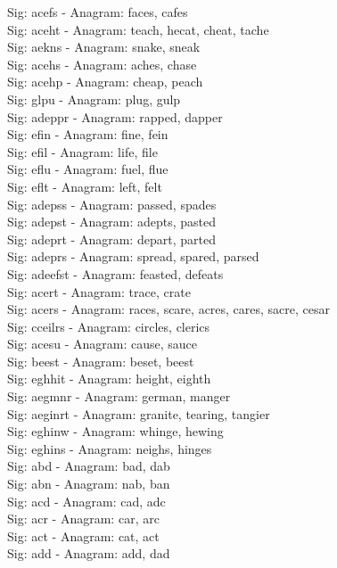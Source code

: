 Sig: {acefs} - Anagram: faces, cafes \\
Sig: {aceht} - Anagram: teach, hecat, cheat, tache \\
Sig: {aekns} - Anagram: snake, sneak \\
Sig: {acehs} - Anagram: aches, chase \\
Sig: {acehp} - Anagram: cheap, peach \\
Sig: {glpu} - Anagram: plug, gulp \\
Sig: {adeppr} - Anagram: rapped, dapper \\
Sig: {efin} - Anagram: fine, fein \\
Sig: {efil} - Anagram: life, file \\
Sig: {eflu} - Anagram: fuel, flue \\
Sig: {eflt} - Anagram: left, felt \\
Sig: {adepss} - Anagram: passed, spades \\
Sig: {adepst} - Anagram: adepts, pasted \\
Sig: {adeprt} - Anagram: depart, parted \\
Sig: {adeprs} - Anagram: spread, spared, parsed \\
Sig: {adeefst} - Anagram: feasted, defeats \\
Sig: {acert} - Anagram: trace, crate \\
Sig: {acers} - Anagram: races, scare, acres, cares, sacre, cesar \\
Sig: {cceilrs} - Anagram: circles, clerics \\
Sig: {acesu} - Anagram: cause, sauce \\
Sig: {beest} - Anagram: beset, beest \\
Sig: {eghhit} - Anagram: height, eighth \\
Sig: {aegmnr} - Anagram: german, manger \\
Sig: {aeginrt} - Anagram: granite, tearing, tangier \\
Sig: {eghinw} - Anagram: whinge, hewing \\
Sig: {eghins} - Anagram: neighs, hinges \\
Sig: {abd} - Anagram: bad, dab \\
Sig: {abn} - Anagram: nab, ban \\
Sig: {acd} - Anagram: cad, adc \\
Sig: {acr} - Anagram: car, arc \\
Sig: {act} - Anagram: cat, act \\
Sig: {add} - Anagram: add, dad \\
